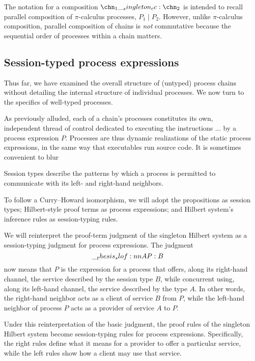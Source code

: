 The notation for a composition $\chn_1 \cc \chn_2$ is intended to recall parallel composition of $\pi$-calculus processes, $P_1 \mid P_2$.
However, unlike $\pi$-calculus composition, parallel composition of chains is \emph{not} commutative because the sequential order of processes within a chain matters.


\subsection{Session-typed process expressions}

Thus far, we have examined the overall structure of (untyped) process chains without detailing the internal structure of individual processes.
We now turn to the specifics of well-typed processes.

As previously alluded, each of a chain's processes constitutes its own, independent thread of control dedicated to executing the instructions ... by a process expression $P$.
Processes are thus dynamic realizations of the static process expressions, in the same way that executables run source code.
It is sometimes convenient to blur

Session types describe the patterns by which a process is permitted to communicate with its left- and right-hand neighbors.

To follow a Curry--Howard isomorphism, we will adopt the propositions as session types; Hilbert-style proof terms as process expressions; and Hilbert system's inference rules as session-typing rules.

We will reinterpret the proof-term judgment of the singleton Hilbert system as a session-typing judgment for process expressions.
The judgment
\begin{equation*}
  \slof{A |- P : B} %
\end{equation*}
now means that $P$ is the expression for a process that
offers, along its right-hand channel, the service described by the session type $B$, while concurrent using, along its left-hand channel, the service described by the type $A$.
In other words, the right-hand neighbor acts as a client of service $B$ from $P$, while the left-hand neighbor of process $P$ acts as a provider of service $A$ to $P$.

Under this reinterpretation of the basic judgment, the proof rules of the singleton Hilbert system become session-typing rules for process expressions.
Specifically, the right rules define what it means for a provider to offer a particular service, while the left rules show how a client may use that service.


